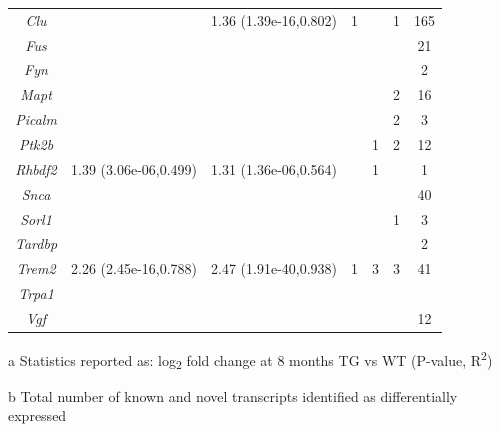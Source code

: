 \begin{table}[]
\begin{threeparttable}
\begin{tabular}{@{}ccccccc@{}}
		\textit{Clu} &
		\cellcolor[HTML]{EFEFEF} &
		1.36 (1.39e-16,0.802) &
		1 &
		\cellcolor[HTML]{EFEFEF} &
		1 &
		165 \\
		\textit{Fus} &
		\cellcolor[HTML]{EFEFEF} &
		\cellcolor[HTML]{EFEFEF} &
		\cellcolor[HTML]{EFEFEF} &
		\cellcolor[HTML]{EFEFEF} &
		\cellcolor[HTML]{EFEFEF} &
		21 \\
		\textit{Fyn} &
		\cellcolor[HTML]{EFEFEF} &
		\cellcolor[HTML]{EFEFEF} &
		\cellcolor[HTML]{EFEFEF} &
		\cellcolor[HTML]{EFEFEF} &
		\cellcolor[HTML]{EFEFEF} &
		2 \\
		\textit{Mapt} &
		\cellcolor[HTML]{EFEFEF} &
		\cellcolor[HTML]{EFEFEF} &
		\cellcolor[HTML]{EFEFEF} &
		\cellcolor[HTML]{EFEFEF} &
		2 &
		16 \\
		\textit{Picalm} &
		\cellcolor[HTML]{EFEFEF} &
		\cellcolor[HTML]{EFEFEF} &
		\cellcolor[HTML]{EFEFEF} &
		\cellcolor[HTML]{EFEFEF} &
		2 &
		3 \\
		\textit{Ptk2b} &
		\cellcolor[HTML]{EFEFEF} &
		\cellcolor[HTML]{EFEFEF} &
		\cellcolor[HTML]{EFEFEF} &
		1 &
		2 &
		12 \\
		\textit{Rhbdf2} &
		1.39 (3.06e-06,0.499) &
		1.31 (1.36e-06,0.564) &
		\cellcolor[HTML]{EFEFEF} &
		1 &
		\cellcolor[HTML]{EFEFEF} &
		1 \\
		\textit{Snca} &
		\cellcolor[HTML]{EFEFEF} &
		\cellcolor[HTML]{EFEFEF} &
		\cellcolor[HTML]{EFEFEF} &
		\cellcolor[HTML]{EFEFEF} &
		\cellcolor[HTML]{EFEFEF} &
		40 \\
		\textit{Sorl1} &
		\cellcolor[HTML]{EFEFEF} &
		\cellcolor[HTML]{EFEFEF} &
		\cellcolor[HTML]{EFEFEF} &
		\cellcolor[HTML]{EFEFEF} &
		1 &
		3 \\
		\textit{Tardbp} &
		\cellcolor[HTML]{EFEFEF} &
		\cellcolor[HTML]{EFEFEF} &
		\cellcolor[HTML]{EFEFEF} &
		\cellcolor[HTML]{EFEFEF} &
		\cellcolor[HTML]{EFEFEF} &
		2 \\
		\textit{Trem2} &
		2.26 (2.45e-16,0.788) &
		2.47 (1.91e-40,0.938) &
		1 &
		3 &
		3 &
		41 \\
		\textit{Trpa1} &
		\cellcolor[HTML]{EFEFEF} &
		\cellcolor[HTML]{EFEFEF} &
		\cellcolor[HTML]{EFEFEF} &
		\cellcolor[HTML]{EFEFEF} &
		\cellcolor[HTML]{EFEFEF} &
		\cellcolor[HTML]{EFEFEF} \\
		\textit{Vgf} &
		\cellcolor[HTML]{EFEFEF} &
		\cellcolor[HTML]{EFEFEF} &
		\cellcolor[HTML]{EFEFEF} &
		\cellcolor[HTML]{EFEFEF} &
		\cellcolor[HTML]{EFEFEF} &
		12 \\ \bottomrule
	\end{tabular}
	\begin{tablenotes}
	\footnotesize
	\item[a] Statistics reported as: log\textsubscript{2} fold change at 8 months TG vs WT (P-value, R\textsuperscript{2})
	\item[b] Total number of known and novel transcripts identified as differentially expressed 
\end{tablenotes}
	\end{threeparttable}
\end{table}


